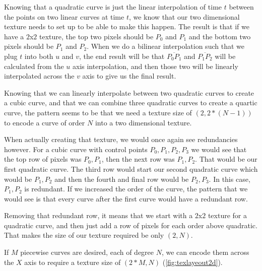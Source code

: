 \documentclass{jcgt}
\begin{document}
Knowing that a quadratic curve is just the linear interpolation of time $t$ between the points on two linear curves at time $t$, we know that our two dimensional texture needs to set up to be able to make this happen.  The result is that if we have a $2$x$2$ texture, the top two pixels should be $P_0$ and $P_1$ and the bottom two pixels should be $P_1$ and $P_2$.  When we do a bilinear interpolation such that we plug $t$ into both $u$ and $v$, the end result will be that $\overline{P_0P_1}$ and $\overline{P_1P_2}$ will be calculated from the $u$ axis interpolation, and then those two will be linearly interpolated across the $v$ axis to give us the final result.

Knowing that we can linearly interpolate between two quadratic curves to create a cubic curve, and that we can combine three quadratic curves to create a quartic curve, the pattern seems to be that we need a texture size of $(2,2*(N-1))$ to encode a curve of order $N$ into a two dimensional texture.

When actually creating that texture, we would once again see redundancies however.  For a cubic curve with control points $P_0,P_1,P_2,P_3$ we would see that the top row of pixels was $P_0,P_1$, then the next row was $P_1,P_2$.  That would be our first quadratic curve.  The third row would start our second quadratic curve which would be $P_1,P_2$ and then the fourth and final row would be $P_2,P_3$.  In this case, $P_1,P_2$ is redundant.  If we increased the order of the curve, the pattern that we would see is that every curve after the first curve would have a redundant row.

Removing that redundant row, it means that we start with a $2$x$2$ texture for a quadratic curve, and then just add a row of pixels for each order above quadratic.  That makes the size of our texture required be only $(2,N)$.

If $M$ piecewise curves are desired, each of degree $N$, we can encode them across the $X$ axis to require a texture size of $(2*M,N)$ (\autoref{fig:texlayeout2d}).
\end{document}
